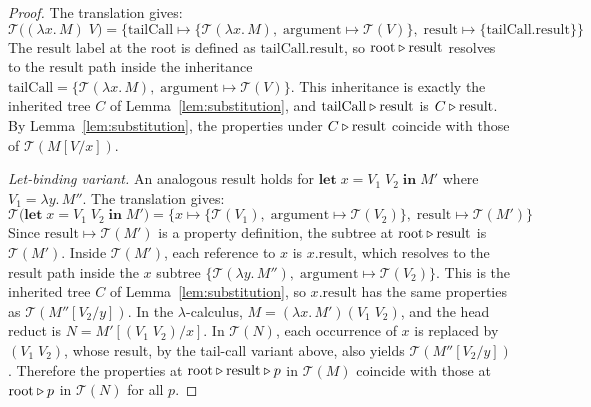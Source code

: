 \begin{proof}
  The translation gives:
  \[
    \mathcal{T}\bigl((\lambda x.\, M)\; V\bigr) =
    \{\mathrm{tailCall} \mapsto
      \{\mathcal{T}(\lambda x.\, M),\;
      \mathrm{argument} \mapsto \mathcal{T}(V)\},\;
      \mathrm{result} \mapsto
    \{\mathrm{tailCall}.\mathrm{result}\}\}
  \]
  The $\mathrm{result}$ label at the root is defined as
  $\mathrm{tailCall}.\mathrm{result}$, so
  $\text{root} \mathbin{\triangleright} \mathrm{result}$ resolves to the
  $\mathrm{result}$ path inside the inheritance
  $\mathrm{tailCall} = \{\mathcal{T}(\lambda x.\, M),\;
  \mathrm{argument} \mapsto \mathcal{T}(V)\}$.
  This inheritance is exactly the inherited tree $C$ of
  Lemma~\ref{lem:substitution}, and
  $\mathrm{tailCall} \mathbin{\triangleright} \mathrm{result}$ is
  $C \mathbin{\triangleright} \mathrm{result}$.
  By Lemma~\ref{lem:substitution}, the properties under
  $C \mathbin{\triangleright} \mathrm{result}$ coincide with those of
  $\mathcal{T}(M[V/x])$.

  \medskip\noindent
  \emph{Let-binding variant.}
  An analogous result holds for
  $\mathbf{let}\; x = V_1\; V_2 \;\mathbf{in}\; M'$
  where $V_1 = \lambda y.\, M''$.
  The translation gives:
  \[
    \mathcal{T}\bigl(\mathbf{let}\; x = V_1\; V_2
    \;\mathbf{in}\; M'\bigr) =
    \{x \mapsto \{\mathcal{T}(V_1),\;
      \mathrm{argument} \mapsto \mathcal{T}(V_2)\},\;
    \mathrm{result} \mapsto \mathcal{T}(M')\}
  \]
  Since $\mathrm{result} \mapsto \mathcal{T}(M')$ is a property
  definition, the subtree at
  $\text{root} \mathbin{\triangleright} \mathrm{result}$ is $\mathcal{T}(M')$.
  Inside $\mathcal{T}(M')$, each reference to $x$ is
  $x.\mathrm{result}$, which resolves to the $\mathrm{result}$
  path inside the $x$ subtree
  $\{\mathcal{T}(\lambda y.\, M''),\;
  \mathrm{argument} \mapsto \mathcal{T}(V_2)\}$.
  This is the inherited tree $C$ of
  Lemma~\ref{lem:substitution}, so
  $x.\mathrm{result}$ has the same properties as
  $\mathcal{T}(M''[V_2/y])$.
  In the $\lambda$-calculus,
  $M = (\lambda x.\, M')(V_1\; V_2)$, and the head reduct is
  $N = M'[(V_1\; V_2)/x]$.
  In $\mathcal{T}(N)$, each occurrence of $x$ is replaced by
  $(V_1\; V_2)$, whose result, by the tail-call variant above,
  also yields $\mathcal{T}(M''[V_2/y])$.
  Therefore the properties at
  $\text{root} \mathbin{\triangleright} \mathrm{result} \mathbin{\triangleright} p$ in
  $\mathcal{T}(M)$ coincide with those at
  $\text{root} \mathbin{\triangleright} p$ in $\mathcal{T}(N)$ for all $p$.


\end{proof}
